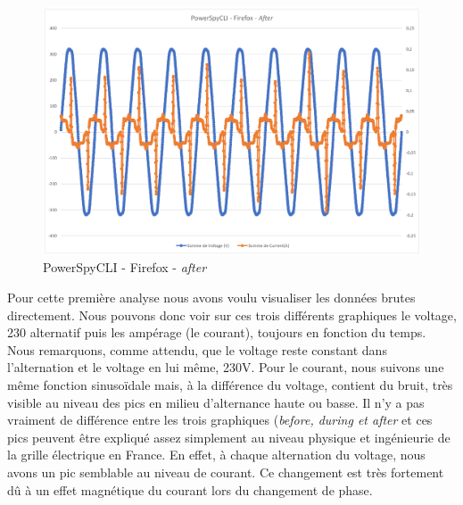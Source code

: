 \documentclass[12pt, a4paper]{report}
\begin{document}
\begin{figure}[H]
    \includegraphics[width=1\linewidth]{res//graph/PowerSpyCLI/PowerSpyCLI-FF-After.png}
    \caption{PowerSpyCLI - Firefox - \textit{after}}
    \label{fig:pscli_ff_after}
\end{figure}

Pour cette première analyse nous avons voulu visualiser les données brutes directement. Nous pouvons donc voir sur ces trois différents graphiques le voltage, 230 alternatif puis les ampérage (le courant), toujours en fonction du temps. Nous remarquons, comme attendu, que le voltage reste constant dans l'alternation et le voltage en lui même, 230V. Pour le courant, nous suivons une même fonction sinusoïdale mais, à la différence du voltage, contient du bruit, très visible au niveau des pics en milieu d'alternance haute ou basse. Il n'y a pas vraiment de différence entre les trois graphiques (\textit{before, during et after} et ces pics peuvent être expliqué assez simplement au niveau physique et ingénieurie de la grille électrique en France. En effet, à chaque alternation du voltage, nous avons un pic semblable au niveau de courant. Ce changement est très fortement dû à un effet magnétique du courant lors du changement de phase. 
\end{document}

